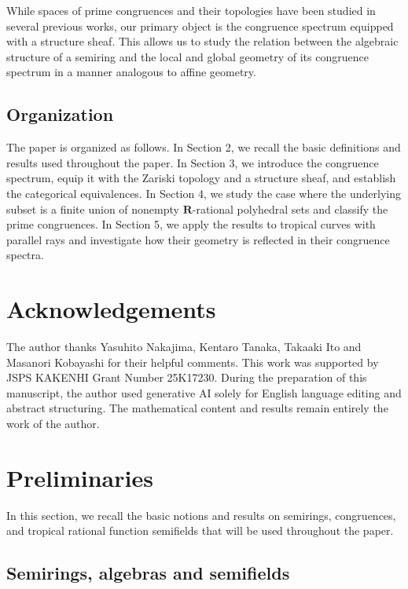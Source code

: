 \documentclass[a4paper,12pt]{amsart}
\theoremstyle{plain}
\theoremstyle{definition}
\begin{document}
While spaces of prime congruences and their topologies have been studied in several previous works, our primary object is the congruence spectrum equipped with a structure sheaf.
This allows us to study the relation between the algebraic structure of a semiring and the local and global geometry of its congruence spectrum in a manner analogous to affine geometry.

\subsection{Organization}
    \label{subsection1.4}

The paper is organized as follows.
In Section 2, we recall the basic definitions and results used throughout the paper.
In Section 3, we introduce the congruence spectrum, equip it with the Zariski topology and a structure sheaf, and establish the categorical equivalences.
In Section 4, we study the case where the underlying subset is a finite union of nonempty $\boldsymbol{R}$-rational polyhedral sets and classify the prime congruences.
In Section 5, we apply the results to tropical curves with parallel rays and investigate how their geometry is reflected in their congruence spectra.

\section*{Acknowledgements}
The author thanks Yasuhito Nakajima, Kentaro Tanaka, Takaaki Ito and Masanori Kobayashi for their helpful comments.
This work was supported by JSPS KAKENHI Grant Number 25K17230.
During the preparation of this manuscript, the author used generative AI solely for English language editing and abstract structuring. 
The mathematical content and results remain entirely the work of the author.

\section{Preliminaries}
	\label{section2}

In this section, we recall the basic notions and results on semirings, congruences, and tropical rational function semifields that will be used throughout the paper.

\subsection{Semirings, algebras and semifields}
	\label{subsection2.1}
\end{document}
